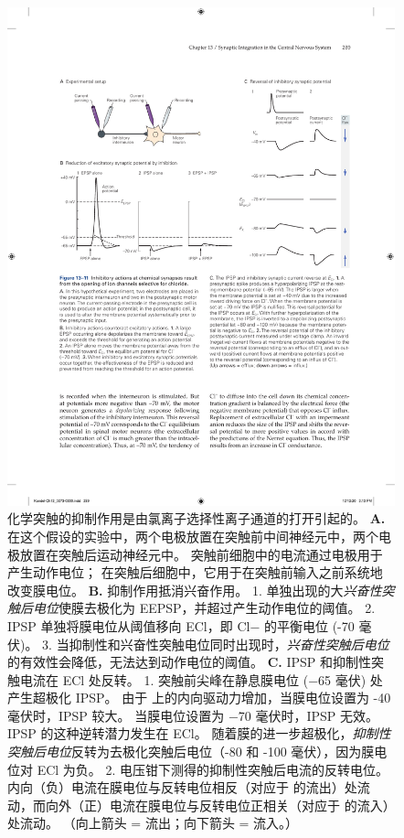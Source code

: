 \begin{figure}[htbp]
	\centering
	\includegraphics[width=0.95\linewidth]{chap13/fig_13_11}
	\caption{化学突触的抑制作用是由氯离子选择性离子通道的打开引起的。
		\textbf{A.} 在这个假设的实验中，两个电极放置在突触前中间神经元中，两个电极放置在突触后运动神经元中。
		突触前细胞中的电流通过电极用于产生动作电位；
		在突触后细胞中，它用于在突触前输入之前系统地改变膜电位。
		\textbf{B.} 抑制作用抵消兴奋作用。
		1. 单独出现的大\textit{兴奋性突触后电位}使膜去极化为 EEPSP，并超过产生动作电位的阈值。
		2. IPSP 单独将膜电位从阈值移向 ECl，即 Cl− 的平衡电位 (-70 毫伏)。
		3. 当抑制性和兴奋性突触电位同时出现时，\textit{兴奋性突触后电位}的有效性会降低，无法达到动作电位的阈值。
		\textbf{C.} IPSP 和抑制性突触电流在 ECl 处反转。
		1. 突触前尖峰在静息膜电位 (−65 毫伏) 处产生超极化 IPSP。
		由于  上的内向驱动力增加，当膜电位设置为 -40 毫伏时，IPSP 较大。
		当膜电位设置为 −70 毫伏时，IPSP 无效。
		IPSP 的这种逆转潜力发生在 ECl。 随着膜的进一步超极化，\textit{抑制性突触后电位}反转为去极化突触后电位（-80 和 -100 毫伏），因为膜电位对 ECl 为负。
		2. 电压钳下测得的抑制性突触后电流的反转电位。
		内向（负）电流在膜电位与反转电位相反（对应于  的流出）处流动，而向外（正）电流在膜电位与反转电位正相关（对应于  的流入）处流动。
		（向上箭头 = 流出；向下箭头 = 流入。）}
	\label{fig:13_11}
\end{figure}


